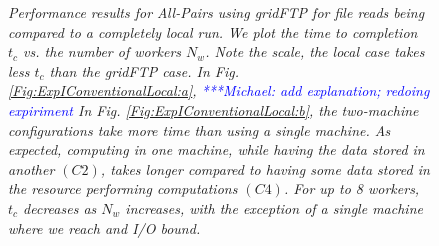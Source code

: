 \documentclass{rspublic}
\newcommand{\micnote}[1]{ {\textcolor{blue} { ***Michael: #1 }}}
\begin{document}
\begin{figure}[!ht]
\begin{center}
\caption{\textit{Performance results for All-Pairs using gridFTP for
file reads being compared to a completely local run. We plot the time to
completion $t_c$ vs. the number of workers $N_w$. Note the scale, the
local case takes less $t_c$  than the gridFTP case. In Fig.
\ref{Fig:ExpIConventionalLocal:a}, \micnote{add explanation; redoing
expiriment} In Fig. \ref{Fig:ExpIConventionalLocal:b}, the two-machine
configurations take more time than using a single machine. As expected,
computing in one machine, while having the data stored in another
$(C2)$, takes longer compared to having some data stored in the resource
performing computations $(C4)$. For up to 8 workers, $t_c$ decreases as
$N_w$ increases, with the exception of a single machine where we reach
and I/O bound.}}
\label{Fig:ExpIConventionalLocal}
\end{center}
\end{figure}
\end{document}
